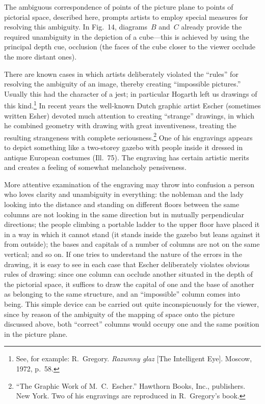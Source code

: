 The ambiguous correspondence of points of the picture plane to points of pictorial space,
described here, prompts artists to employ special measures for resolving this ambiguity.
In Fig.~14, diagrams~$B$ and~$C$ already provide the required unambiguity in the
depiction of a cube---this is achieved by using the principal depth cue, occlusion (the
faces of the cube closer to the viewer occlude the more distant ones).


There are known cases in which artists deliberately violated the ``rules'' for resolving
the ambiguity of an image, thereby creating ``impossible pictures.''  Usually this had
the character of a jest; in particular Hogarth left us drawings of this
kind.\footnote{See, for example: R.~Gregory.  \emph{Razumny glaz} [The Intelligent Eye].
  Moscow, 1972, p.~58.}  In recent years the well-known Dutch graphic artist Escher
(sometimes written Esher) devoted much attention to creating ``strange'' drawings, in
which he combined geometry with drawing with great inventiveness, treating the resulting
strangeness with complete seriousness.\footnote{``The Graphic Work of M.~C.~Escher.''
  Hawthorn Books, Inc., publishers.  New York.  Two of his engravings are reproduced in
  R.~Gregory's book.}  One of his engravings appears to depict something like a
two-storey gazebo with people inside it dressed in antique European costumes (Ill.~75).
The engraving has certain artistic merits and creates a feeling of somewhat melancholy
pensiveness.

More attentive examination of the engraving may throw into confusion a person who loves
clarity and unambiguity in everything: the nobleman and the lady looking into the distance
and standing on different floors between the same columns are not looking in the same
direction but in mutually perpendicular directions; the people climbing a portable ladder
to the upper floor have placed it in a way in which it cannot stand (it stands inside
the gazebo but leans against it from outside); the bases and capitals of a number of
columns are not on the same vertical; and so on.  If one tries to understand the nature
of the errors in the drawing, it is easy to see in each case that Escher deliberately
violates obvious rules of drawing: since one column can occlude another situated in the
depth of the pictorial space, it suffices to draw the capital of one and the base of
another as belonging to the same structure, and an ``impossible'' column comes into being.
This simple device can be carried out quite inconspicuously for the viewer, since by
reason of the ambiguity of the mapping of space onto the picture discussed above, both
``correct'' columns would occupy one and the same position in the picture plane.

